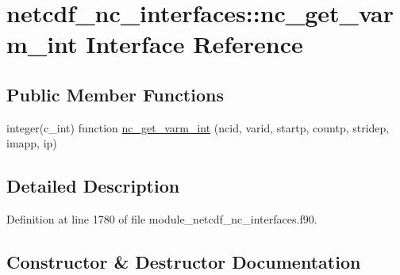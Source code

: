\hypertarget{interfacenetcdf__nc__interfaces_1_1nc__get__varm__int}{}\section{netcdf\+\_\+nc\+\_\+interfaces\+:\+:nc\+\_\+get\+\_\+varm\+\_\+int Interface Reference}
\label{interfacenetcdf__nc__interfaces_1_1nc__get__varm__int}
\subsection*{Public Member Functions}
\begin{DoxyCompactItemize}
\item 
integer(c\+\_\+int) function \hyperlink{interfacenetcdf__nc__interfaces_1_1nc__get__varm__int_a2ba8dd84115900c1513c2ea12a1f41a6}{nc\+\_\+get\+\_\+varm\+\_\+int} (ncid, varid, startp, countp, stridep, imapp, ip)
\end{DoxyCompactItemize}


\subsection{Detailed Description}


Definition at line 1780 of file module\+\_\+netcdf\+\_\+nc\+\_\+interfaces.\+f90.



\subsection{Constructor \& Destructor Documentation}
\mbox{\label{interfacenetcdf__nc__interfaces_1_1nc__get__varm__int_a2ba8dd84115900c1513c2ea12a1f41a6}} 
